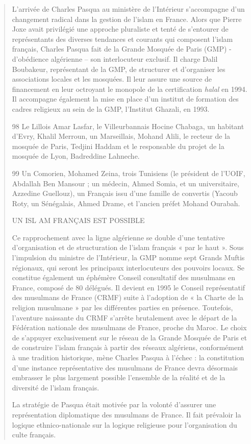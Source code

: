 \begin{quote}
L'arrivée de Charles Pasqua au ministère de l'Intérieur s'accompagne
d'un changement radical dans la gestion de l'islam en France. Alors que
Pierre Joxe avait privilégié une approche pluraliste et tenté de
s'entourer de représentants des diverses tendances et courants qui
composent l'islam français, Charles Pasqua fait de la Grande Mosquée de
Paris (GMP) - d'obédience algérienne -- son interlocuteur exclusif. Il
charge Dalil Boubakeur, représentant de la GMP, de structurer et
d'organiser les associations locales et les mosquées. Il leur assure une
source de financement en leur octroyant le monopole de la certification
\emph{halal} en 1994. Il accompagne également la mise en place d'un
institut de formation des cadres religieux au sein de la GMP, l'Institut
Ghazali, en 1993.

98 Le Lillois Amar Lasfar, le Villeurbannais Hocine Chabaga, un habitant
d'Evry, Khalil Merroun, un Marseillais, Mohand Alili, le recteur de la
mosquée de Paris, Tedjini Haddam et le responsable du projet de la
mosquée de Lyon, Badreddine Lahneche.

99 Un Comorien, Mohamed Zeina, trois Tunisiens (le président de l'UOIF,
Abdallah Ben Mansour ; un médecin, Ahmed Somia, et un universitaire,
Azzedine Guellouz), un Français issu d'une famille de convertis (Yacoub
Roty, un Sénégalais, Ahmed Drame, et l'ancien préfet Mohand Ourabah.

UN ISL AM FRANÇAIS EST POSSIBLE

Ce rapprochement avec la ligne algérienne se double d'une tentative
d'organisation et de structuration de l'islam français « par le haut ».
Sous l'impulsion du ministre de l'Intérieur, la GMP nomme sept Grands
Muftis régionaux, qui seront les principaux interlocuteurs des pouvoirs
locaux. Se constitue également un éphémère Conseil consultatif des
musulmans en France, composé de 80 délégués. Il devient en 1995 le
Conseil représentatif des musulmans de France (CRMF) suite à l'adoption
de « la Charte de la religion musulmane » par les différentes parties en
présence. Toutefois, l'aventure naissante du CRMF s'arrête brutalement
avec le départ de la Fédération nationale des musulmans de France,
proche du Maroc. Le choix de s'appuyer exclusivement sur le réseau de la
Grande Mosquée de Paris et de construire l'islam français à partir des
réseaux algériens, conformément à une tradition historique, mène Charles
Pasqua à l'échec : la constitution d'une instance représentative des
musulmans de France devra désormais embrasser le plus largement possible
l'ensemble de la réalité et de la diversité de l'islam français.

La stratégie de Pasqua était motivée par la volonté d'assurer une
représentation diplomatique des musulmans de France. Il fait prévaloir
la logique ethnico-nationale sur la logique religieuse pour
l'organisation du culte français.
\end{quote}

